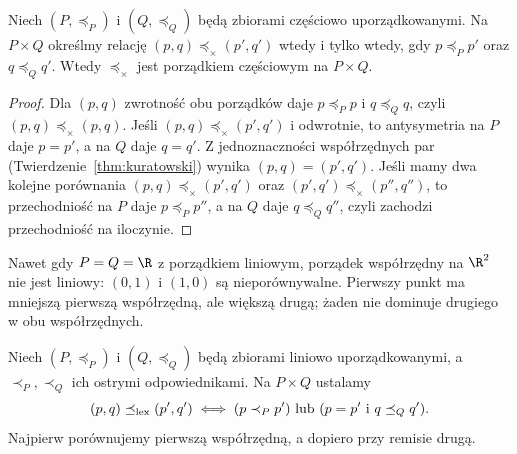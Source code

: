 \begin{twierdzenie}
\label{thm:product-poset}
Niech $(P,\preceq_P)$ i $(Q,\preceq_Q)$ będą zbiorami
częściowo uporządkowanymi. Na $P\times Q$ określmy relację
$(p,q)\preceq_\times(p',q')$ wtedy i tylko wtedy, gdy
$p\preceq_P p'$ oraz $q\preceq_Q q'$.
Wtedy $\preceq_\times$ jest porządkiem częściowym na $P\times Q$.
\end{twierdzenie}
\begin{proof}
Dla $(p,q)$ zwrotność obu porządków daje
$p\preceq_P p$ i $q\preceq_Q q$,
czyli $(p,q)\preceq_\times(p,q)$.
Jeśli $(p,q)\preceq_\times(p',q')$ i odwrotnie,
to antysymetria na $P$ daje $p=p'$, a na $Q$ daje
$q=q'$. Z jednoznaczności współrzędnych par
(Twierdzenie~\ref{thm:kuratowski}) wynika
$(p,q)=(p',q')$. Jeśli mamy dwa kolejne porównania
$(p,q)\preceq_\times(p',q')$ oraz
$(p',q')\preceq_\times(p'',q'')$, to przechodniość
na $P$ daje $p\preceq_P p''$, a na $Q$ daje
$q\preceq_Q q''$, czyli zachodzi przechodniość na iloczynie.
\end{proof}

\begin{przyklad}
Nawet gdy $P=Q=\R$ z porządkiem liniowym,
porządek współrzędny na $\R^2$ nie jest liniowy:
$(0,1)$ i $(1,0)$ są nieporównywalne.
Pierwszy punkt ma mniejszą pierwszą współrzędną,
ale większą drugą; żaden nie dominuje drugiego
w obu współrzędnych.
\end{przyklad}

\begin{definicja}
Niech $(P,\preceq_P)$ i $(Q,\preceq_Q)$ będą
zbiorami liniowo uporządkowanymi, a $\prec_P,\prec_Q$
ich ostrymi odpowiednikami. Na $P\times Q$ ustalamy
\[
 (p,q)\preceq_{\rm lex}(p',q')\iff
 (p\prec_P p')\ \text{lub}\ (p=p'\text{ i }q\preceq_Q q').
\]
Najpierw porównujemy pierwszą współrzędną, a dopiero
przy remisie drugą.
\end{definicja}

